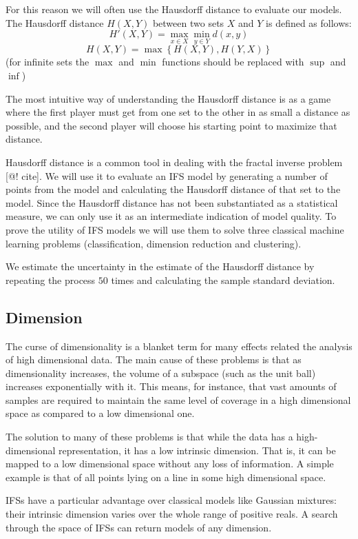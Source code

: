\documentclass[10pt]{article}
\theoremstyle{definition}
\begin{document}
For this reason we will often use the Hausdorff distance to evaluate our models. The Hausdorff distance  $H(X, Y)$ between two sets $X$ and $Y$ is defined as follows:
\[ 
H'(X, Y) = \max_{x\in X} \min_{y\in Y} d(x, y) 
\]
\[
H(X, Y) = \max\left \{H(X, Y), H(Y, X)\right\}
\]
 (for infinite sets the $\max$ and $\min$ functions should be replaced with $\sup$ and $\inf$)
 
The most intuitive way of understanding the Hausdorff distance is as a game where the first player must get from one set to the other in as small a distance as possible, and the second player will choose his starting point to maximize that distance.

Hausdorff distance is a common tool in dealing with the fractal inverse problem [@! cite]. We will use it to evaluate an IFS model by generating a number of points from the model and calculating the Hausdorff distance of that set to the model. Since the Hausdorff distance has not been substantiated as a statistical measure, we can only use it as an intermediate indication of model quality. To prove the utility of IFS models we will use them to solve three classical machine learning problems (classification, dimension reduction and clustering).

We estimate the uncertainty in the estimate of the Hausdorff distance by repeating the process $50$ times and calculating the sample standard deviation. 

\subsection{Dimension}

The curse of dimensionality is a blanket term for many effects related the analysis of high dimensional data. The main cause of these problems is that as dimensionality increases, the volume of a subspace (such as the unit ball) increases exponentially with it. This means, for instance, that vast amounts of samples are required to maintain the same level of coverage in a high dimensional space as compared to a low dimensional one. 

The solution to many of these problems is that while the data has a high-dimensional representation, it has a low intrinsic dimension. That is, it can be mapped to a low dimensional space without any loss of information. A simple example is that of all points lying on a line in some high dimensional space. 

IFSs have a particular advantage over classical models like Gaussian mixtures: their intrinsic dimension varies over the whole range of positive reals. A search through the space of IFSs can return models of any dimension.
\end{document}
